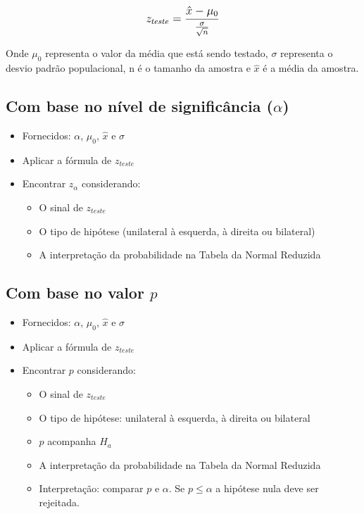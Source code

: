 \[\beq{ z_{teste} = \frac{\hat{x}-\mu_0}{\frac{\sigma}{\sqrt{n}}} } \]

Onde \(\mu_0\) representa o valor da média que está sendo testado, \(\sigma\) representa o desvio padrão populacional, n é o tamanho da amostra e \(\hat{x}\) é a média da amostra.

\subsection{Com base no nível de significância (\(\alpha\))}

\begin{itemize}
	\item Fornecidos: \(\alpha\), \(\mu_0\), \(\hat{x}\) e \(\sigma\)
	\item Aplicar a fórmula de \(z_{teste}\)
	\item Encontrar \(z_{\alpha}\) considerando:
	\begin{itemize}
		\item O sinal de \(z_{teste}\)
		\item O tipo de hipótese (unilateral à esquerda, à direita ou bilateral)
		\item A interpretação da probabilidade na Tabela da Normal Reduzida
	\end{itemize}
\end{itemize}		
	
\subsection{Com base no valor \(p\)}

\begin{itemize}
	\item Fornecidos: \(\alpha\), \(\mu_0\), \(\hat{x}\) e \(\sigma\)
	\item Aplicar a fórmula de \(z_{teste}\)
	\item Encontrar \(p\) considerando:
	\begin{itemize}
		\item O sinal de \(z_{teste}\)
		\item O tipo de hipótese: unilateral à esquerda, à direita ou bilateral 
		\item \(p\) acompanha \(H_a\)
		\item A interpretação da probabilidade na Tabela da Normal Reduzida
		\item Interpretação: comparar \(p\) e \(\alpha\). Se \(p \leq \alpha\) a hipótese nula deve ser rejeitada.
	\end{itemize}
\end{itemize}		

